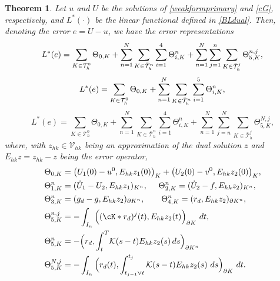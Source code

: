 \documentclass{amsart}
\numberwithin{equation}{section}
\newtheorem{theorem}{Theorem}
\theoremstyle{definition}
\begin{document}
\begin{theorem}
Let $u$ and $U$ be the solutions of \eqref{weakformprimary} 
and \eqref{cG}, respectively, 
and $L^*(\cdot)$ be the linear functional defined in \eqref{BLdual}.
Then, denoting the error $e=U-u$, we have the error representations
\begin{equation}   \label{errorrep1}
  L^*(e)=\sum_{K\in{\mathcal T}_h^0}\Theta_{0,K}
     +\sum_{n=1}^N \sum_{K\in\bar{\mathcal T}_h^n}
     \sum_{i=1}^4 \Theta_{i,K}^n
     +\sum_{n=1}^N \sum_{j=1}^n\sum_{K\in\bar{\mathcal T}_h^j}\Theta_{5,K}^{n,j},\\
\end{equation}
\begin{equation}   \label{errorrep2}
  L^*(e)=\sum_{K\in{\mathcal T}_h^0}\Theta_{0,K}
     +\sum_{n=1}^N \sum_{K\in\bar{\mathcal T}_h^n}
     \sum_{i=1}^5 \Theta_{i,K}^n,\\
\end{equation}
\begin{equation}  \label{errorrep3}
  L^*(e)=\sum_{K\in{\mathcal T}_h^0}\Theta_{0,K}
     +\sum_{n=1}^N \sum_{K\in\bar{\mathcal T}_h^n}
     \sum_{i=1}^4 \Theta_{i,K}^n
     +\sum_{n=1}^N \sum_{j=n}^N\sum_{K\in\bar{\mathcal T}_h^j}\Theta_{5,K}^{N,j},
\end{equation}
where, with $z_{hk}\in{\mathcal V}_{hk}$ being an approximation of the dual
solution $z$ and $E_{hk}z=z_{hk}-z$ being the error operator,
\begin{equation}   \label{thetas}
  \begin{split}
    &\Theta_{0,K}=
     \big(U_1(0)-u^0,E_{hk}z_1(0)\big)_{K}
     +\big(U_2(0)-v^0,E_{hk}z_2(0)\big)_{K},\\
    &\Theta_{1,K}^n=
     (\dot U_1-U_2,E_{hk}z_1)_{K^n},\ \quad
     \Theta_{2,K}^n=
      (\dot U_2-f,E_{hk}z_2)_{K^n},\\
    & \Theta_{3,K}^n=
      (g_d-g,E_{hk}z_2)_{\partial K^n}, \qquad 
      \Theta_{4,K}^n=
      (r_d,E_{hk}z_2)_{\partial K^n},\\
    &  \Theta_{5,K}^{n,j}=
      -\int_{I_n}\Big((\cK*r_d)^j(t),E_{hk}z_2(t)\Big)_{\partial K}\ dt, \\
    &\Theta_{5,K}^n=
      -\Big(r_d,\int_t^T\! {\mathcal K}(s-t)E_{hk}z_2(s)\,ds\Big)_{\partial K^n}\\
    &  \Theta_{5,K}^{N,j}=
      -\int_{I_n}\Big(r_d(t),
        \int_{t_{j-1}\vee t}^{t_j}{\mathcal K}(s-t)E_{hk}z_2(s)\ ds\Big)_{\partial K}\ dt.
  \end{split}
\end{equation}

\end{theorem}
\end{document}
